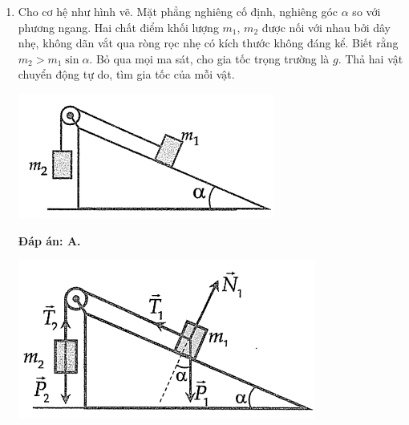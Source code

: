 \begin{enumerate}[label=\bfseries Câu \arabic*:]
{		Do dây chỉ chịu được lực căng tối đa $0,6\ \text N$, nên thay số ta tính được $F$ tối đa là $F=1,6\ \text N$.
		
		
	}
	\item {}
	
	\cauhoi
	{Cho cơ hệ như hình vẽ. Mặt phẳng nghiêng cố định, nghiêng góc $\alpha$ so với phương ngang. Hai chất điểm khối lượng $m_1$, $m_2$ được nối với nhau bởi dây nhẹ, không dãn vắt qua ròng rọc nhẹ có kích thước không đáng kể. Biết rằng $m_2 > m_1 \sin \alpha$. Bỏ qua mọi ma sát, cho gia tốc trọng trường là $g$. Thả hai vật chuyển động tự do, tìm gia tốc của mỗi vật.
		\begin{center}
			\includegraphics[scale=0.8]{../figs/VN11-Y21-PH-SYL-007-3}
		\end{center}
		
	}
	
	\loigiai
	{\textbf{Đáp án: A.}
		
		\begin{center}
			\includegraphics[scale=0.8]{../figs/VN11-Y21-PH-SYL-007-4}
		\end{center}
		
}
\end{enumerate}
